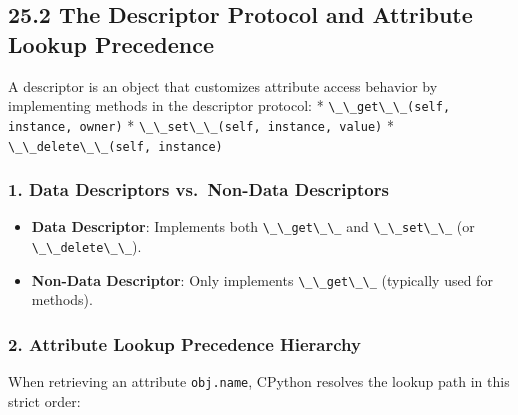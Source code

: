 \hypertarget{the-descriptor-protocol-and-attribute-lookup-precedence}{%
\subsection{25.2 The Descriptor Protocol and Attribute Lookup
Precedence}\label{the-descriptor-protocol-and-attribute-lookup-precedence}}

A descriptor is an object that customizes attribute access behavior by
implementing methods in the descriptor protocol: *
\passthrough{\lstinline!\_\_get\_\_(self, instance, owner)!} *
\passthrough{\lstinline!\_\_set\_\_(self, instance, value)!} *
\passthrough{\lstinline!\_\_delete\_\_(self, instance)!}

\hypertarget{data-descriptors-vs.-non-data-descriptors}{%
\subsubsection{1. Data Descriptors vs.~Non-Data
Descriptors}\label{data-descriptors-vs.-non-data-descriptors}}

\begin{itemize}
\tightlist
\item
  \textbf{Data Descriptor}: Implements both
  \passthrough{\lstinline!\_\_get\_\_!} and
  \passthrough{\lstinline!\_\_set\_\_!} (or
  \passthrough{\lstinline!\_\_delete\_\_!}).
\item
  \textbf{Non-Data Descriptor}: Only implements
  \passthrough{\lstinline!\_\_get\_\_!} (typically used for methods).
\end{itemize}

\hypertarget{attribute-lookup-precedence-hierarchy}{%
\subsubsection{2. Attribute Lookup Precedence
Hierarchy}\label{attribute-lookup-precedence-hierarchy}}

When retrieving an attribute \passthrough{\lstinline!obj.name!}, CPython
resolves the lookup path in this strict order:

